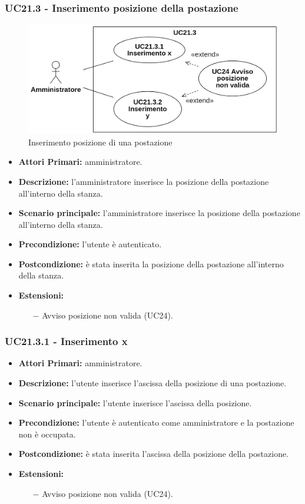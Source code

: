 \subsubsection{UC21.3 - Inserimento posizione della postazione}
\begin{figure}[H]
	\centering
	\includegraphics[width=18cm]{res/images/UC21.3.png}
	\caption{Inserimento posizione di una postazione}
\end{figure}
\begin{itemize}
	\item\textbf{Attori Primari:}
	amministratore.
	\item\textbf{Descrizione:}
	l'amministratore inserisce la posizione della postazione all'interno della stanza.
	\item\textbf{Scenario principale:} 
	l'amministratore inserisce la posizione della postazione all'interno della stanza.
	\item\textbf{Precondizione:} 
	l'utente è autenticato.
	\item\textbf{Postcondizione:}
	è stata inserita la posizione della postazione all'interno della stanza.
	\item\textbf{Estensioni:}
	\begin{itemize}
		\item[$-$] Avviso posizione non valida (UC24).
	\end{itemize}
\end{itemize}

\subsubsection{ UC21.3.1 - Inserimento x}
\begin{itemize}
	\item\textbf{Attori Primari:}
	amministratore.
	\item\textbf{Descrizione:}
	l'utente inserisce l'ascissa della posizione di una postazione.
	\item\textbf{Scenario principale:} 
	l'utente inserisce l'ascissa della posizione.
	\item\textbf{Precondizione:} 
	l'utente è autenticato come amministratore e la postazione non è occupata.
	\item\textbf{Postcondizione:}
	è stata inserita l'ascissa della posizione della postazione.
	\item\textbf{Estensioni:}
	\begin{itemize}
		\item[$-$] Avviso posizione non valida (UC24).
	\end{itemize}
\end{itemize}

